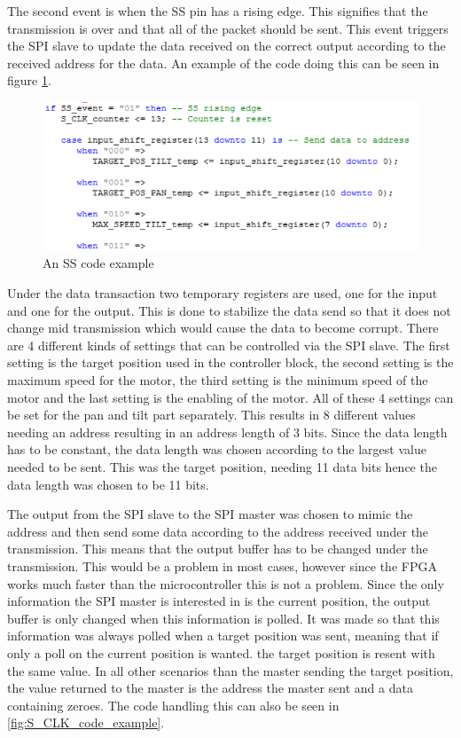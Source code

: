 \newpage

The second event is when the SS pin has a rising edge. This signifies that the transmission is over and that all of the packet should be sent. This event triggers the SPI slave to update the data received on the correct output according to the received address for the data. An example of the code doing this can be seen in figure \ref{fig:SS_code_example}.

\begin{figure}[h!]
\centering
\includegraphics[scale=0.5]{Billeder/FPGA/SPI_Slave/SS_code_example.png}
\caption{ An SS code example }
\label{fig:SS_code_example}
\end{figure}

Under the data transaction two temporary registers are used, one for the input and one for the output. This is done to stabilize the data send so that it does not change mid transmission which would cause the data to become corrupt.
There are 4 different kinds of settings that can be controlled via the SPI slave. The first setting is the target position used in the controller block, the second setting is the maximum speed for the motor, the third setting is the minimum speed of the motor and the last setting is the enabling of the motor. All of these 4  settings can be set for the pan and tilt part separately. This results in 8 different values needing an address resulting in an address length of 3 bits.
Since the data length has to be constant, the data length was chosen according to the largest value needed to be sent. This was the target position, needing 11 data bits hence the data length was chosen to be 11 bits. 

The output from the SPI slave to the SPI master was chosen to mimic the address and then send some data according to the address received under the transmission. This means that the output buffer has to be changed under the transmission. This would be a problem in most cases, however since the FPGA works much faster than the microcontroller this is not a problem. Since the only information the SPI master is interested in is the current position, the output buffer is only changed when this information is polled. It was made so that this information was always polled when a target position was sent, meaning that if only a poll on the current position is wanted. the target position is resent with the same value. In all other scenarios than the master sending the target position, the value returned to the master is the address the master sent and a data containing zeroes. The code handling this can also be seen in \ref{fig:S_CLK_code_example}.

